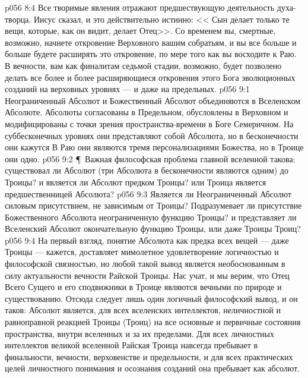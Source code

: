 \vs p056 8:4 Все творимые явления отражают предшествующую деятельность духа\hyp{}творца. Иисус сказал, и это действительно истинно: << Сын делает только те вещи, которые, как он видит, делает Отец>>. Со временем вы, смертные, возможно, начнете откровение Верховного вашим собратьям, и вы все больше и больше будете расширять это откровение, по мере того как вы восходите к Раю. В вечности, вам как финалитам седьмой стадии, возможно, будет позволено делать все более и более расширяющиеся откровения этого Бога эволюционных созданий на верховных уровнях --- и даже на предельных.
\vs p056 9:1 Неограниченный Абсолют и Божественный Абсолют объединяются в Вселенском Абсолюте. Абсолюты согласованы в Предельном, обусловлены в Верховном и модифицированы с точки зрения пространства\hyp{}времени в Боге Семеричном. На суббесконечных уровнях они представляют собой  Абсолюта, но в бесконечности они кажутся  В Раю они являются тремя персонализациями Божества, но в Троице они  одно.
\vs p056 9:2 \P\ Важная философская проблема главной вселенной такова: существовал ли Абсолют (три Абсолюта в бесконечности являются одним) до Троицы? и является ли Абсолют предком Троицы? или Троица является предшественницей Абсолюта?
\vs p056 9:3 Является ли Неограниченный Абсолют силовым присутствием, не зависимым от Троицы? Подразумевает ли присутствие Божественного Абсолюта неограниченную функцию Троицы? и представляет ли Вселенский Абсолют окончательную функцию Троицы, или даже Троицы Троиц?
\vs p056 9:4 На первый взгляд, понятие Абсолюта как предка всех вещей --- даже Троицы --- кажется, доставляет мимолетное удовлетворение логичностью и философской связностью, но любой такой вывод является необоснованным в силу актуальности вечности Райской Троицы. Нас учат, и мы верим, что Отец Всего Сущего и его сподвижники в Троице являются вечными по природе и существованию. Отсюда следует лишь один логичный философский вывод, и он таков: Абсолют является, для всех вселенских интеллектов, неличностной и равноправной реакцией Троицы (Троиц) на все основные и первичные состояния пространства, внутри вселенных и за их пределами. Для всех личностных интеллектов великой вселенной Райская Троица навсегда пребывает в финальности, вечности, верховенстве и предельности, и для всех практических целей личностного понимания и осознания созданий она пребывает как абсолют.
